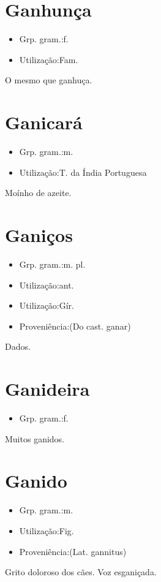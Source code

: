 \section{Ganhunça}
\begin{itemize}
\item {Grp. gram.:f.}
\end{itemize}
\begin{itemize}
\item {Utilização:Fam.}
\end{itemize}
O mesmo que \textunderscore ganhuça\textunderscore .
\section{Ganicará}
\begin{itemize}
\item {Grp. gram.:m.}
\end{itemize}
\begin{itemize}
\item {Utilização:T. da Índia Portuguesa}
\end{itemize}
Moínho de azeite.
\section{Ganiços}
\begin{itemize}
\item {Grp. gram.:m. pl.}
\end{itemize}
\begin{itemize}
\item {Utilização:ant.}
\end{itemize}
\begin{itemize}
\item {Utilização:Gír.}
\end{itemize}
\begin{itemize}
\item {Proveniência:(Do cast. \textunderscore ganar\textunderscore )}
\end{itemize}
Dados.
\section{Ganideira}
\begin{itemize}
\item {Grp. gram.:f.}
\end{itemize}
Muitos ganidos.
\section{Ganido}
\begin{itemize}
\item {Grp. gram.:m.}
\end{itemize}
\begin{itemize}
\item {Utilização:Fig.}
\end{itemize}
\begin{itemize}
\item {Proveniência:(Lat. \textunderscore gannitus\textunderscore )}
\end{itemize}
Grito doloroso dos cães.
Voz esganiçada.
